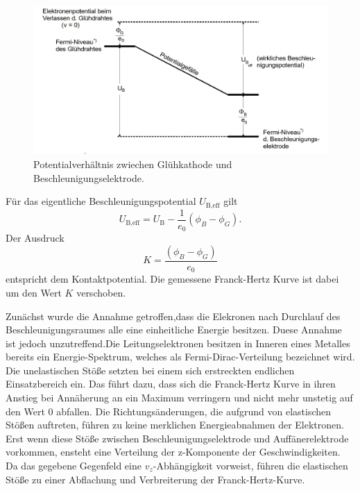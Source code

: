 \begin{figure}[H]
	\centering
	\includegraphics[width=1.0\linewidth]{content/grafik/potential.png}
	\caption{Potentialverhältnis zwiechen Glühkathode und Beschleunigungselektrode. \cite{franck}}
	\label{fig:potential}
\end{figure}

Für das eigentliche Beschleunigungspotential $U_{\text{B}, \text{eff}}$ gilt 
\begin{equation}
    U_{\text{B}, \text{eff}}=U_{\text{B}}-\frac{1}{e_0}\left(\phi_B-\phi_G\right).
    \label{eqn:potential}
\end{equation}
Der Ausdruck 
\begin{equation}
    K = \frac{\left( \phi_B - \phi_G \right)}{e_0} 
    \label{eq:Kontaktpotential} 
\end{equation}
entspricht dem Kontaktpotential. Die gemessene Franck-Hertz Kurve ist dabei um den Wert $K$ verschoben.

Zunächst wurde die Annahme getroffen,dass die Elekronen nach Durchlauf des Beschleunigungsraumes alle eine einheitliche 
Energie besitzen. Duese Annahme ist jedoch unzutreffend.Die Leitungselektronen besitzen in Inneren eines Metalles bereits 
ein Energie-Spektrum, welches als Fermi-Dirac-Verteilung bezeichnet wird.
Die unelastischen Stöße setzten bei einem sich erstreckten endlichen Einsatzbereich ein. Das führt dazu, dass
sich die Franck-Hertz Kurve in ihren Anstieg bei Annäherung an ein Maximum verringern und nicht mehr unstetig auf den Wert 0 abfallen.
Die Richtungsänderungen, die aufgrund von elastischen Stößen auftreten, führen zu keine merklichen Energieabnahmen der Elektronen.
Erst wenn diese Stöße zwischen Beschleunigungselektrode und Auffänerelektrode vorkommen, ensteht eine Verteilung
der z-Komponente der Geschwindigkeiten. Da das gegebene Gegenfeld eine $v_z$-Abhängigkeit vorweist, führen die elastischen
Stöße zu einer Abflachung und Verbreiterung der Franck-Hertz-Kurve.

